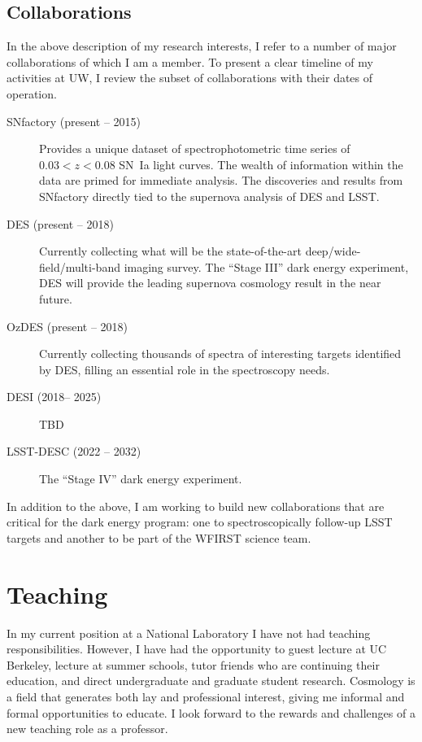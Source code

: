 \documentclass{article}
\begin{document}
\subsection{Collaborations}
In the above description of my research interests, I refer to a number of major collaborations of which I am a member.  To
present a clear timeline of my  activities at UW, I review the subset of collaborations with their dates of operation.
\begin{description}
\item[SNfactory (present -- 2015)]  Provides a unique dataset of
spectrophotometric time series of $0.03<z<0.08$ SN~Ia light curves.  The wealth of information
within the data are primed for immediate analysis. The discoveries and results from SNfactory directly tied to the supernova
analysis of DES and LSST.
\item[DES (present -- 2018)] Currently collecting what will be the state-of-the-art deep/wide-field/multi-band
imaging survey.   The ``Stage III'' dark energy experiment, DES will provide the leading supernova
cosmology result in the near future.
\item[OzDES (present -- 2018)] Currently collecting thousands of spectra of interesting targets identified by DES,
filling an essential role in the spectroscopy needs.
\item[DESI (2018-- 2025)] TBD
\item[LSST-DESC (2022 -- 2032)]  The ``Stage IV'' dark energy experiment.
\end{description}

In addition to the above, I am working to build new collaborations that are critical for the dark energy program: one
to
spectroscopically follow-up LSST targets and another to be part of the WFIRST science team.

\section{Teaching}
In my current position at a National Laboratory I have not had teaching responsibilities.  However,
I have had the opportunity to guest lecture at UC Berkeley, lecture at summer schools, tutor friends
who are continuing their education, and direct undergraduate and graduate student research.  Cosmology
is a field that generates both lay and professional interest, giving me informal and formal opportunities to
educate.  I look forward to the rewards and challenges of a new teaching role as a professor. 
\end{document}
